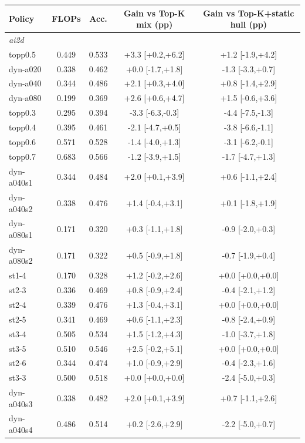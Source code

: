 \begin{table}[t]\centering\small
\begin{tabular}{lcccc}\toprule
Policy & FLOPs & Acc. & Gain vs Top-K mix (pp) & Gain vs Top-K+static hull (pp)\\\midrule
\multicolumn{5}{l}{\textit{ai2d}}\\
topp0.5 & 0.449 & 0.533 & +3.3 [+0.2,+6.2] & +1.2 [-1.9,+4.2]\\
dyn-a020 & 0.338 & 0.462 & +0.0 [-1.7,+1.8] & -1.3 [-3.3,+0.7]\\
dyn-a040 & 0.344 & 0.486 & +2.1 [+0.3,+4.0] & +0.8 [-1.4,+2.9]\\
dyn-a080 & 0.199 & 0.369 & +2.6 [+0.6,+4.7] & +1.5 [-0.6,+3.6]\\
topp0.3 & 0.295 & 0.394 & -3.3 [-6.3,-0.3] & -4.4 [-7.5,-1.3]\\
topp0.4 & 0.395 & 0.461 & -2.1 [-4.7,+0.5] & -3.8 [-6.6,-1.1]\\
topp0.6 & 0.571 & 0.528 & -1.4 [-4.0,+1.3] & -3.1 [-6.2,-0.1]\\
topp0.7 & 0.683 & 0.566 & -1.2 [-3.9,+1.5] & -1.7 [-4.7,+1.3]\\
dyn-a040s1 & 0.344 & 0.484 & +2.0 [+0.1,+3.9] & +0.6 [-1.1,+2.4]\\
dyn-a040s2 & 0.338 & 0.476 & +1.4 [-0.4,+3.1] & +0.1 [-1.8,+1.9]\\
dyn-a080s1 & 0.171 & 0.320 & +0.3 [-1.1,+1.8] & -0.9 [-2.0,+0.3]\\
dyn-a080s2 & 0.171 & 0.322 & +0.5 [-0.9,+1.8] & -0.7 [-1.9,+0.4]\\
st1-4 & 0.170 & 0.328 & +1.2 [-0.2,+2.6] & +0.0 [+0.0,+0.0]\\
st2-3 & 0.336 & 0.469 & +0.8 [-0.9,+2.4] & -0.4 [-2.1,+1.2]\\
st2-4 & 0.339 & 0.476 & +1.3 [-0.4,+3.1] & +0.0 [+0.0,+0.0]\\
st2-5 & 0.341 & 0.469 & +0.6 [-1.1,+2.3] & -0.8 [-2.4,+0.9]\\
st3-4 & 0.505 & 0.534 & +1.5 [-1.2,+4.3] & -1.0 [-3.7,+1.8]\\
st3-5 & 0.510 & 0.546 & +2.5 [-0.2,+5.1] & +0.0 [+0.0,+0.0]\\
st2-6 & 0.344 & 0.474 & +1.0 [-0.9,+2.9] & -0.4 [-2.3,+1.6]\\
st3-3 & 0.500 & 0.518 & +0.0 [+0.0,+0.0] & -2.4 [-5.0,+0.3]\\
dyn-a040s3 & 0.338 & 0.482 & +2.0 [+0.1,+3.9] & +0.7 [-1.1,+2.6]\\
dyn-a040s4 & 0.486 & 0.514 & +0.2 [-2.6,+2.9] & -2.2 [-5.0,+0.7]\\

\end{tabular}
\end{table}
